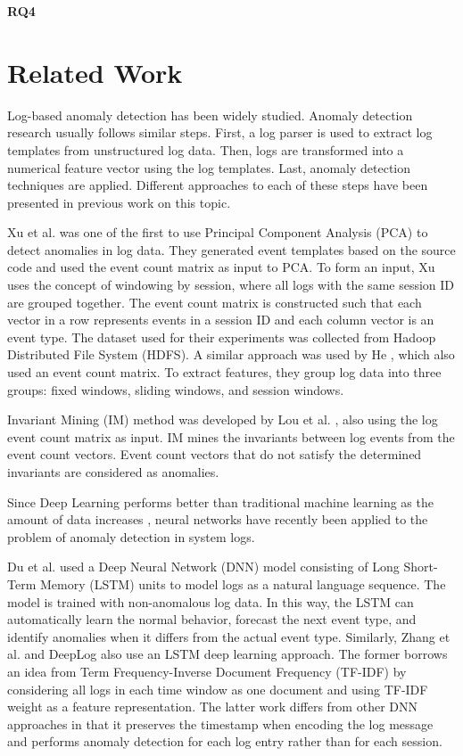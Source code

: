 \textbf{RQ4} \textit{\RQFourth}\\ 
    


\section{Related Work}
Log-based anomaly detection has been widely studied. Anomaly detection research usually follows similar steps. First, a log parser is used to extract log templates from unstructured log data. Then, logs are transformed into a numerical feature vector using the log templates. Last, anomaly detection techniques are applied.
Different approaches to each of these steps have been presented in previous work on this topic. 

Xu et al. \cite{xu2009} was one of the first to use Principal Component Analysis (PCA) to detect anomalies in log data. They generated event templates based on the source code and used the event count matrix as input to PCA. To form an input, Xu uses the concept of windowing by session, where all logs with the same session ID are grouped together. The event count matrix is constructed such that each vector in a row represents events in a session ID and each column vector is an event type. The dataset used for their experiments was collected from Hadoop Distributed File System (HDFS).
A similar approach was used by He \cite{he2016}, which also used an event count matrix. To extract features, they group log data into three groups: fixed windows, sliding windows, and session windows. 

Invariant Mining (IM) method was developed by Lou et al. \cite{lou2010}, also using the log event count matrix as input. IM mines the invariants between log events from the event count vectors. Event count vectors that do not satisfy the determined invariants are considered as anomalies. 

Since Deep Learning performs better than traditional machine learning as the amount of data increases \cite{Sydney2019DeepLF}, neural networks have recently been applied to the problem of anomaly detection in system logs. 

Du et al. \cite{duLSTM2017} used a Deep Neural Network (DNN) model consisting of Long Short-Term Memory (LSTM) units to model logs as a natural language sequence. The model is trained with non-anomalous log data. In this way, the LSTM can automatically learn the normal behavior, forecast the next event type, and identify anomalies when it differs from the actual event type. Similarly, Zhang et al. \cite{zhang2016} and DeepLog \cite{deeplog2017} also use an LSTM deep learning approach. The former borrows an idea from Term Frequency-Inverse Document Frequency (TF-IDF) by considering all logs in each time window as one document and using TF-IDF weight as a feature representation. The latter work differs from other DNN approaches in that it preserves the timestamp when encoding the log message and performs anomaly detection for each log entry rather than for each session.

